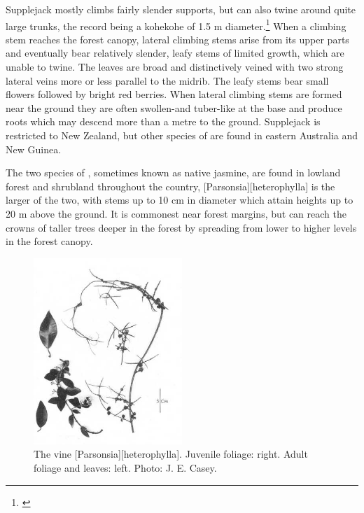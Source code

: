 Supplejack mostly climbs fairly slender supports, but can also twine around quite large trunks, the record being a kohekohe of 1.5 m diameter.\footnote{\cite{macmillan1973biological}}
When a climbing stem reaches the forest canopy, lateral climbing stems arise from its upper parts and eventually bear relatively slender, leafy stems of limited growth, which are unable to twine.
The leaves are broad and distinctively veined with two strong lateral veins more or less parallel to the midrib.
The leafy stems bear small flowers followed by bright red berries.
When lateral climbing stems are formed near the ground they are often swollen-and tuber-like at the base and produce roots which may descend more than a metre to the ground.
Supplejack is restricted to New Zealand, but other species of  are found in eastern Australia and New Guinea.

The two species of , sometimes known as native jasmine, are found in lowland forest and shrubland throughout the country, [Parsonsia][heterophylla] is the larger of the two, with stems up to 10 cm in diameter which attain heights up to 20 m above the ground.
It is commonest near forest margins, but can reach the crowns of taller trees deeper in the forest by spreading from lower to higher levels in the forest canopy.

\begin{figure}
	\includegraphics[width=0.5\textwidth]{graphics/figure34parsonsia.jpg}
	\centering
	\caption[The vine \emph{Parsonsia heterophylla}]{The vine [Parsonsia][heterophylla]. Juvenile foliage: right. Adult foliage and leaves: left. Photo: J. E. Casey.}%
	\label{fig:34parsonsia}
\end{figure}

